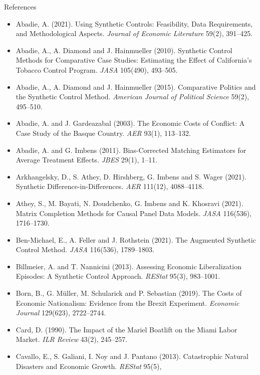 \documentclass[
  11pt,
  ignorenonframetext,
  aspectratio=169,
]{beamer}
\providecommand{\tightlist}{%
  \setlength{\itemsep}{0pt}\setlength{\parskip}{0pt}}
\begin{document}
\begin{frame}{References}
\protect{}\label{references}
\tiny

\begin{itemize}
\tightlist
\item
  Abadie, A. (2021). Using Synthetic Controls: Feasibility, Data
  Requirements, and Methodological Aspects. \emph{Journal of Economic
  Literature} 59(2), 391--425.
\item
  Abadie, A., A. Diamond and J. Hainmueller (2010). Synthetic Control
  Methods for Comparative Case Studies: Estimating the Effect of
  California's Tobacco Control Program. \emph{JASA} 105(490), 493--505.
\item
  Abadie, A., A. Diamond and J. Hainmueller (2015). Comparative Politics
  and the Synthetic Control Method. \emph{American Journal of Political
  Science} 59(2), 495--510.
\item
  Abadie, A. and J. Gardeazabal (2003). The Economic Costs of Conflict:
  A Case Study of the Basque Country. \emph{AER} 93(1), 113--132.
\item
  Abadie, A. and G. Imbens (2011). Bias-Corrected Matching Estimators
  for Average Treatment Effects. \emph{JBES} 29(1), 1--11.
\item
  Arkhangelsky, D., S. Athey, D. Hirshberg, G. Imbens and S. Wager
  (2021). Synthetic Difference-in-Differences. \emph{AER} 111(12),
  4088--4118.
\item
  Athey, S., M. Bayati, N. Doudchenko, G. Imbens and K. Khosravi (2021).
  Matrix Completion Methods for Causal Panel Data Models. \emph{JASA}
  116(536), 1716--1730.
\item
  Ben-Michael, E., A. Feller and J. Rothstein (2021). The Augmented
  Synthetic Control Method. \emph{JASA} 116(536), 1789--1803.
\item
  Billmeier, A. and T. Nannicini (2013). Assessing Economic
  Liberalization Episodes: A Synthetic Control Approach. \emph{REStat}
  95(3), 983--1001.
\item
  Born, B., G. Müller, M. Schularick and P. Sebastian (2019). The Costs
  of Economic Nationalism: Evidence from the Brexit Experiment.
  \emph{Economic Journal} 129(623), 2722--2744.
\item
  Card, D. (1990). The Impact of the Mariel Boatlift on the Miami Labor
  Market. \emph{ILR Review} 43(2), 245--257.
\item
  Cavallo, E., S. Galiani, I. Noy and J. Pantano (2013). Catastrophic
  Natural Disasters and Economic Growth. \emph{REStat} 95(5),

\end{itemize}
\end{frame}
\end{document}
